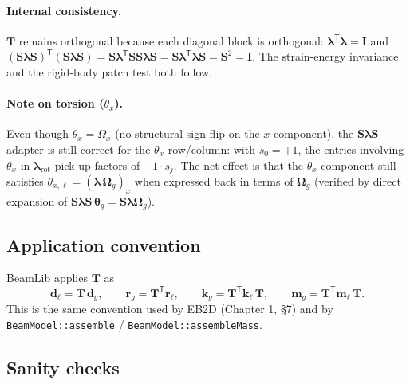 \documentclass[11pt,a4paper]{article}
\newcommand{\bmath}[1]{\boldsymbol{#1}}
\begin{document}
\paragraph{Internal consistency.}
$\bmath{T}$ remains orthogonal because each diagonal block is orthogonal: $\bmath{\lambda}^\mathsf{T}\bmath{\lambda} = \bmath{I}$ and $(\bmath{S}\bmath{\lambda}\bmath{S})^\mathsf{T}(\bmath{S}\bmath{\lambda}\bmath{S}) = \bmath{S}\bmath{\lambda}^\mathsf{T}\bmath{S}\bmath{S}\bmath{\lambda}\bmath{S} = \bmath{S}\bmath{\lambda}^\mathsf{T}\bmath{\lambda}\bmath{S} = \bmath{S}^2 = \bmath{I}$. The strain-energy invariance and the rigid-body patch test both follow.

\paragraph{Note on torsion ($\theta_x$).}
Even though $\theta_x = \Omega_x$ (no structural sign flip on the $x$ component), the $\bmath{S}\bmath{\lambda}\bmath{S}$ adapter is still correct for the $\theta_x$ row/column: with $s_0 = +1$, the entries involving $\theta_x$ in $\bmath{\lambda}_{\text{rot}}$ pick up factors of $+1 \cdot s_j$. The net effect is that the $\theta_x$ component still satisfies $\theta_{x,\ell} = (\bmath{\lambda}\,\bmath{\Omega}_g)_x$ when expressed back in terms of $\bmath{\Omega}_g$ (verified by direct expansion of $\bmath{S}\bmath{\lambda}\bmath{S}\,\bmath{\theta}_g = \bmath{S}\bmath{\lambda}\bmath{\Omega}_g$).

\subsection{Application convention}

BeamLib applies $\bmath{T}$ as
\[
\bmath{d}_\ell = \bmath{T}\,\bmath{d}_g, \qquad
\bmath{r}_g = \bmath{T}^\mathsf{T}\bmath{r}_\ell, \qquad
\bmath{k}_g = \bmath{T}^\mathsf{T}\bmath{k}_\ell\,\bmath{T}, \qquad
\bmath{m}_g = \bmath{T}^\mathsf{T}\bmath{m}_\ell\,\bmath{T}.
\]
This is the same convention used by EB2D (Chapter 1, \S7) and by \texttt{BeamModel::assemble} / \texttt{BeamModel::assembleMass}.

\subsection{Sanity checks}
\end{document}

